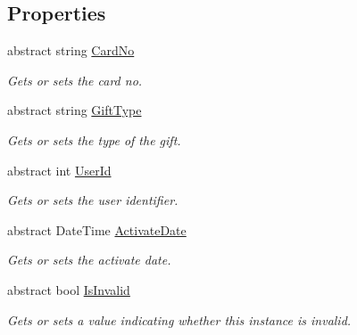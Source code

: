 \subsection*{Properties}
\begin{DoxyCompactItemize}
\item 
abstract string \mbox{\hyperlink{class_t_net_1_1_com_1_1_model_1_1_gift_novice_card_a8d3dd9be1cf27915e2d32fd921476017}{Card\+No}}
\begin{DoxyCompactList}\small\item\em Gets or sets the card no. \end{DoxyCompactList}\item 
abstract string \mbox{\hyperlink{class_t_net_1_1_com_1_1_model_1_1_gift_novice_card_af659388e2d9266b881c99d817ddbbe67}{Gift\+Type}}
\begin{DoxyCompactList}\small\item\em Gets or sets the type of the gift. \end{DoxyCompactList}\item 
abstract int \mbox{\hyperlink{class_t_net_1_1_com_1_1_model_1_1_gift_novice_card_a977310d8d7a5fabe074a0ed2f1863ad2}{User\+Id}}
\begin{DoxyCompactList}\small\item\em Gets or sets the user identifier. \end{DoxyCompactList}\item 
abstract Date\+Time \mbox{\hyperlink{class_t_net_1_1_com_1_1_model_1_1_gift_novice_card_a9f83a30648bc8bb6070e7b7055f4efdb}{Activate\+Date}}
\begin{DoxyCompactList}\small\item\em Gets or sets the activate date. \end{DoxyCompactList}\item 
abstract bool \mbox{\hyperlink{class_t_net_1_1_com_1_1_model_1_1_gift_novice_card_a81ce70d2323ee01083dcd5e285ce626f}{Is\+Invalid}}
\begin{DoxyCompactList}\small\item\em Gets or sets a value indicating whether this instance is invalid. \end{DoxyCompactList}\item 

\end{DoxyCompactItemize}
